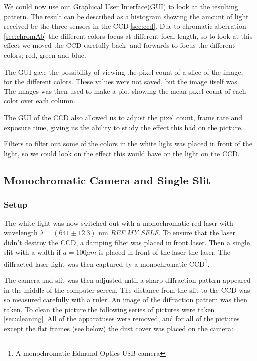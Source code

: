 \documentclass{emulateapj}
\begin{document}
We could now use out Graphical User Interface(GUI) to look at the resulting pattern. The result can be described as a histogram showing the amount of light received be the three sensors in the CCD \ref{sec:ccd}. Due to chromatic aberration \ref{sec:chromAb} the different colors focus at different focal length, so to look at this effect we moved the CCD carefully back- and forwards to focus the different colors; red, green and blue.

The GUI gave the possibility of viewing the pixel count of a slice of the image, for the different colors. These values were not saved, but the image itself was. The images was then used to make a plot showing the mean pixel count of each color over each column.

The GUI of the CCD also allowed us to adjust the pixel count, frame rate and exposure time, giving us the ability to study the effect this had on the picture.

Filters to filter out some of the colors in the white light was placed in front of the light, so we could look on the effect this would have on the light on the CCD. 


\subsection{Monochromatic Camera and Single Slit}

\subsubsection{Setup}

The white light was now switched out with a monochromatic red laser with wavelength $\lambda = (641 \pm 12.3)$ nm \emph{REF MY SELF}. To ensure that the laser didn't destroy the CCD, a damping filter was placed in front laser. Then a single slit with a width if $a = 100\mu m$ is placed in front of the laser the laser. The diffracted laser light was then captured by a monochromatic CCD\footnote{A monochromatic Edmund Optics USB camera}. 

The camera and slit was then adjusted until a sharp diffraction pattern appeared in the middle of the computer screen. The distance from the slit to the CCD was so measured carefully with a ruler. An image of the diffraction pattern was then taken. To clean the picture the following series of pictures were taken \ref{sec:cleaning}. All of the apparatuses were removed, and for all of the pictures except the flat frames (see below) the dust cover was placed on the camera: \\
\end{document}
